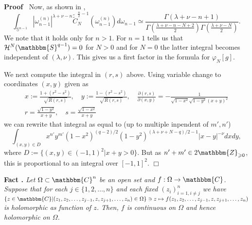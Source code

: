 \documentclass{article}
\newcommand{\assign}{:=}
\newcommand{\tmtextbf}[1]{{\bfseries{#1}}}
\newcommand{\tmtextit}[1]{{\itshape{#1}}}
\newcommand{\tmtextup}[1]{{\upshape{#1}}}
\newenvironment{proof}{\noindent\textbf{Proof\ }}{\hspace*{\fill}$\Box$\medskip}
\begin{document}
\begin{proof}
  Now, as shown in {\cite[lem. 7.6]{kobayashi2015symmetry}},
  \[ \int_{\mathbb{S}^{n - 1}} | \omega_{n - 1}^{(n)} |^{\lambda + \nu - n} 
     \widetilde{\tilde{C}}_N^{\frac{n}{2} - 1} (\omega_{n - 1}^{(n)}) d
     \omega_{n - 1} \simeq \frac{\Gamma (\lambda + \nu - n + 1)}{\Gamma \left(
     \frac{\lambda + \nu - n - N + 2}{2} \right) \Gamma \left( \frac{\lambda +
     \nu - N}{2} \right)} . \]
  We note that it holds only for $n > 1$. For $n = 1$ {\cite[p.
  6]{howe1993homogeneous}} tells us that $\mathcal{H}^N (\mathbbm{S}^{q - 1})
  = 0$ for $N > 0$ and for $N = 0$ the latter integral becomes independent of
  $(\lambda, \nu)$. This gives us a first factor in the formula for $\varphi_N
  [g]$.
  
  We next compute the integral in $(r, s)$ above. Using variable change to
  coordinates $(x, y)$ given as
  \begin{eqnarray}
    & x \assign \frac{1 + (r^2 - s^2)}{\sqrt{R (r, s)}}, \quad y \assign
    \frac{1 - (r^2 - s^2)}{\sqrt{R (r, s)}}, \quad \frac{\partial (r,
    s)}{\partial (x, y)} = - \frac{1}{\sqrt{1 - x^2} \sqrt{1 - y^2} (x + y)^2}
    &  \nonumber\\
    & r = \frac{\sqrt{1 - y^2}}{x + y}, \quad s = \frac{\sqrt{1 - x^2}}{x +
    y} &  \nonumber
  \end{eqnarray}
  we can rewrite that integral as equal to (up to multiple inpendent of $m',
  n'$)
  \[ \int_{(x, y) \in D} x^{n'} y^{m'} (1 - x^2)^{(q - 2) / 2} (1 -
     y^2)^{(\lambda + \nu + N - q) / 2 - 1} | x - y |^{- \nu} d x d y, \]
  where $D \assign \{ (x, y) \in (- 1, 1)^2 | x + y > 0 \}$. But as $n' + m'
  \in 2\mathbbm{Z}_{\geqslant 0}$, this is proportional to an integral over
  $[- 1, 1]^2$.
\end{proof}

{\noindent}\tmtextbf{Fact \tmtextup{19}.
}\tmtextit{\label{k-finite:fact-hartogs}{\cite[thm.
1.2.5]{krantz1982function}} Let $\Omega \subset \mathbbm{C}^n$ be an open set
and $f : \Omega \rightarrow \mathbbm{C}$. Suppose that for each $j \in \{ 1,
2, \ldots, n \}$ and each fixed $(z_i)_{i = 1, i \neq j}^n$ we have $\{ z \in
\mathbbm{C} | (z_1, z_2, \ldots, z_{j - 1}, z, z_{j + 1}, \ldots, z_n) \in
\Omega \} \ni z \mapsto f (z_1, z_2, \ldots, z_{j - 1}, z, z_{j + 1}, \ldots,
z_n)$ is holomorphic as function of $z$. Then, $f$ is continuous on $\Omega$
and hence holomorphic on $\Omega$.}{\hspace*{\fill}}{\medskip}
\end{document}
